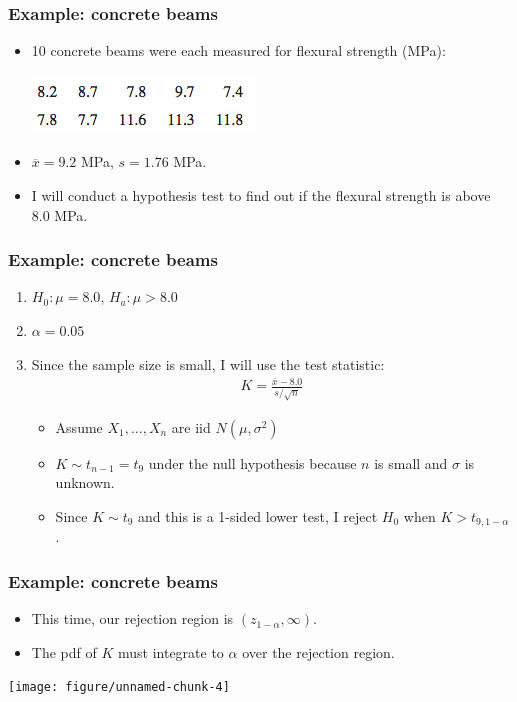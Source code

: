 \documentclass[handout]{beamer}\usepackage{graphicx, color}
\newenvironment{knitrout}{}{} %
\providecommand{\ov}[1]{\overline{#1}}
\numberwithin{equation}{section}
\begin{document}
\begin{frame}
\frametitle{Example: concrete beams}
\begin{itemize}
\item 10 concrete beams were each measured for flexural strength (MPa):
\pause \begin{center}
 \includegraphics{../../fig/fbeams.png}
\end{center}
\pause \item $\ov{x} = 9.2$ MPa, $s = 1.76$ MPa.
\pause \item I will conduct a hypothesis test to find out if the flexural strength is above 8.0 MPa.
\end{itemize}
\end{frame}

\begin{frame}
\frametitle{Example: concrete beams}
\begin{enumerate}[1. ]
\item  $H_0: \mu = 8.0$, $H_a: \mu > 8.0$
\pause \item $\alpha = 0.05$
\pause \item Since the sample size is small, I will use the test statistic:
\begin{align*}
K = \frac{\ov{x} - 8.0}{s/\sqrt{n}}
\end{align*}
\begin{itemize}
\pause \item Assume $X_1, \ldots, X_n$ are iid $N(\mu, \sigma^2)$
\pause \item $K \sim t_{n - 1} = t_{9}$ under the null hypothesis because $n$ is small and $\sigma$ is unknown.
\pause \item Since $K \sim t_9$ and this is a 1-sided lower test, I reject $H_0$ when $K > t_{9, 1-\alpha}$.
\end{itemize}

\end{enumerate}
\end{frame}






\begin{frame}[fragile]
\frametitle{Example: concrete beams}
\begin{itemize}
\item This time, our rejection region is $( z_{1-\alpha}, \infty)$.
\pause \item The pdf of $K$ must integrate to $\alpha$ over the rejection region.
\end{itemize}
\pause \begin{center}
\begin{knitrout}
\color{fgcolor}
\texttt{[image: figure/unnamed-chunk-4]} 

\end{knitrout}


\end{center}
\end{frame}
\end{document}
